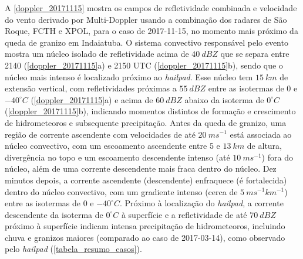 A \autoref{doppler_20171115} mostra os campos de refletividade combinada e velocidade do vento derivado por Multi-Doppler usando a combinação dos radares de São Roque, FCTH e XPOL, para o caso de 2017-11-15, no momento mais próximo da queda de granizo em Indaiatuba. O sistema convectivo responsável pelo evento mostra um núcleo isolado de refletividade acima de $40\:dBZ$ que se separa entre 2140 (\autoref{doppler_20171115}a) e 2150 UTC (\autoref{doppler_20171115}b), sendo que o núcleo mais intenso é localizado próximo ao \textit{hailpad}. Esse núcleo tem $15\:km$ de extensão vertical, com refletividades próximas a $55\:dBZ$ entre as isotermas de 0 e $-40^{\circ}C$ (\autoref{doppler_20171115}a) e acima de $60\:dBZ$ abaixo da isoterma de $0^{\circ}C$ (\autoref{doppler_20171115}b), indicando momentos distintos de formação e crescimento de hidrometeoros e subsequente precipitação. Antes da queda de granizo, uma região de corrente ascendente com velocidades de até $20\:ms^{-1}$ está associada ao núcleo convectivo, com um escoamento ascendente entre 5 e $13\:km$ de altura, divergência no topo e um escoamento descendente intenso (até $10\:ms^{-1}$) fora do núcleo, além de uma corrente descendente mais fraca dentro do núcleo. Dez minutos depois, a corrente ascendente (descendente) enfraquece (é fortalecida) dentro do núcleo convectivo, com um gradiente intenso (cerca de $5\:ms^{-1}km^{-1}$) entre as isotermas de 0 e $-40^{\circ}C$. Próximo à localização do \textit{hailpad}, a corrente descendente da isoterma de $0^{\circ}C$ à superfície e a refletividade de até $70\:dBZ$ próximo à superfície indicam intensa precipitação de hidrometeoros, incluindo chuva e granizos maiores (comparado ao caso de 2017-03-14), como observado pelo \textit{hailpad} (\autoref{tabela_resumo_casos}).

